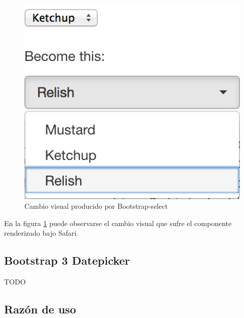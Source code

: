 \begin{figure}[!htbp]
	\centering
	\includegraphics[scale=0.45]{fig/bootstrap_select}
	\caption{Cambio visual producido por Bootstrap-select}
	\label{fig:bootstrap-select}
\end{figure}

\FloatBarrier

En la figura \ref{fig:bootstrap-select} puede observarse el cambio visual que sufre el componente  renderizado bajo Safari\cite{Safari}.

\subsection{Bootstrap 3 Datepicker}

TODO

\subsection{Razón de uso}

